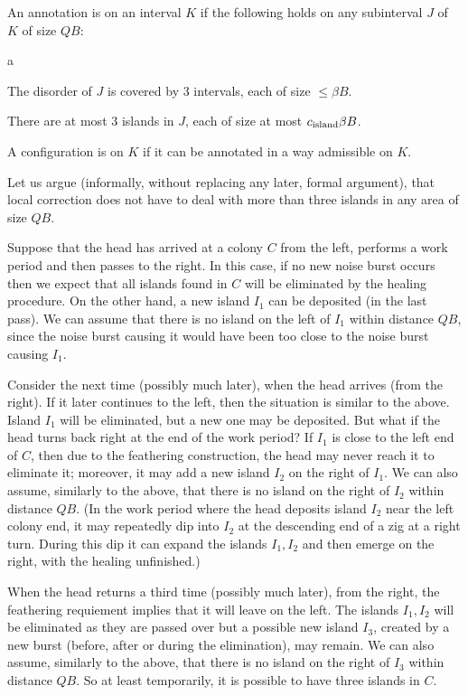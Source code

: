 \documentclass[11pt]{memoir}
\theoremstyle{definition} %
\renewcommand{\le}{\leq}
\def\B{B}
\newcommand{\Q}{Q}
\newcommand{\cns}[1]{c_{\textrm{\upshape #1}}}
\begin{document}
\begin{definition}[Admissibility]\label{def:admissible}
An annotation is  on an interval \( K \) if the following holds on any subinterval 
\( J \) of \( K \) of size \( \Q\B \):
\begin{varenum}[series=admissible]{a}
\item The disorder of \( J \) is covered by 3 intervals, each of size \( \le \beta\B \).
\item There are at most 3 islands in \( J \), each of size at most \( \cns{island}\beta\B \).
\end{varenum}
A configuration is  on \( K \) if it can be annotated in a way admissible on \( K \).
\end{definition}

Let us argue (informally, without replacing any later, formal argument), that local correction
does not have to deal with more than three islands in any area of size \( \Q\B \). 

\begin{example}\label{xmp:3-islands}
  Suppose that the head has arrived at a colony \( C \) from the left,
performs a work period and then passes to the right.
In this case, if no new noise burst occurs then we expect that
all islands found in \( C \) will be eliminated by the healing procedure.
On the other hand, a new island \( I_{1} \) can be deposited (in the last pass).
We can assume that there is no island on the left of  \( I_{1} \) 
within distance \( \Q\B \), since the noise burst
causing it would have been too close to the noise burst causing \( I_{1} \).

Consider the next time (possibly much later), when the head arrives (from the right).
If it later continues to the left, then the situation is similar to the above.
Island \( I_{1} \) will be eliminated, but a new one may be deposited.
But what if the head turns back right at the end of the work period?
If \( I_{1} \) is close to the left end of \( C \), then due to the feathering
construction, the head may never reach it to eliminate it; moreover,
it may add a new island \( I_{2} \) on the right of \( I_{1} \).
We can also assume, similarly to the above, 
that there is no island on the right of  \( I_{2} \) within distance \( \Q\B \).
(In the work period where the head deposits island \( I_{2} \) near the left colony
end, it may repeatedly dip into \( I_{2} \) at the descending end of a zig at a
right turn.
During this dip it can expand the islands
\( I_{1}, I_{2} \) and then emerge on the right, with the healing unfinished.)

When the head returns a third time (possibly much later), 
from the right, the feathering requiement implies that it will leave on the left.
The islands \( I_{1},I_{2} \) will be eliminated as they are passed over
but a possible new island
\( I_{3} \), created by a new burst (before, after or during the elimination), may remain.
We can also assume, similarly to the above, 
that there is no island on the right of  \( I_{3} \) within distance \( \Q\B \).
So at least temporarily, it is possible to have three islands in \( C \).
 \end{example}
\end{document}
